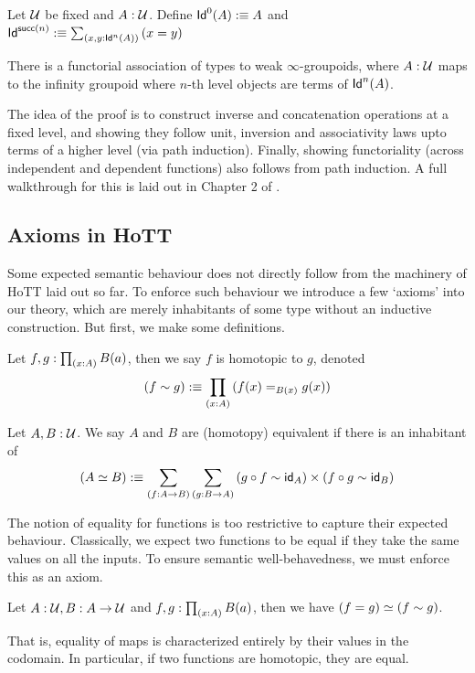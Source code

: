Let $\mathcal{U}$ be fixed and $A : \mathcal{U}$. Define $\mathsf{Id}^0(A) :\equiv A$ and $\mathsf{Id}^{\mathsf{succ}(n)} :\equiv \sum_{(x,y : \mathsf{Id}^n(A))}{(x =y)}$ 
\begin{theorem}
  There is a functorial association of types to weak $\infty$-groupoids, where $A : \mathcal{U}$ maps to the infinity groupoid where $n$-th level objects are terms of 
  $\mathsf{Id}^n(A)$.
\end{theorem}
The idea of the proof is to construct inverse and concatenation operations at a fixed level, and showing they follow
unit, inversion and associativity laws upto terms of a higher level (via path induction). Finally, showing functoriality (across independent
and dependent functions) also follows from path induction.
A full walkthrough for this is laid out in Chapter 2 of \cite{HoTT}.

\subsection{Axioms in HoTT}
Some expected semantic behaviour does not directly follow from the machinery of HoTT laid out so far. To enforce such behaviour
we introduce a few `axioms' into our theory, which are merely inhabitants of some type without an inductive construction. But first,
we make some definitions.

\begin{definition} 
  Let $f, g : \prod_{(x:A)}{B(a)}$, then we say $f$ is homotopic to $g$, denoted
  \[
    (f \sim g) :\equiv \prod_{(x:A)}{(f(x) =_{B(x)} g(x))}
  \]
\end{definition}

\begin{definition}[Equivalence]
  Let $A, B : \mathcal{U}$. We say $A$ and $B$ are (homotopy) equivalent if there is an inhabitant of 
  \[
    (A \simeq B) :\equiv \sum_{(f : A \to B)}{\sum_{(g : B \to A)}{(g \circ f \sim \mathsf{id}_A) \times (f \circ g \sim \mathsf{id}_B)}}
  \]
\end{definition}

The notion of equality for functions is too restrictive to capture their expected behaviour.
Classically, we expect two functions to be equal if they take the same values on all the inputs.
To ensure semantic well-behavedness, we must enforce this as an axiom.

\begin{axiom}
   Let $A : \mathcal{U}, B : A \to \mathcal{U}$ and $f, g : \prod_{(x:A)}{B(a)}$, then we have
   $    (f = g) \simeq (f \sim g)$. 
\end{axiom}
That is, equality of maps is characterized entirely by their values in the codomain.
In particular, if two functions are homotopic, they are equal.

